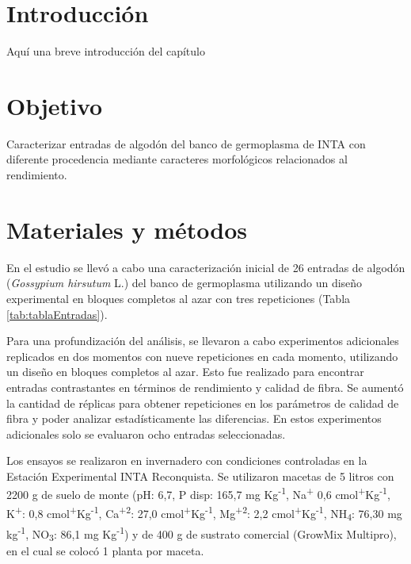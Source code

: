\documentclass[12pt,oneside]{reedthesis}
\begin{document}
\section{Introducción}\label{introducciuxf3n-1}

Aquí una breve introducción del capítulo\\

\section{Objetivo}\label{objetivo}

Caracterizar entradas de algodón del banco de germoplasma de INTA con diferente procedencia mediante caracteres morfológicos relacionados al rendimiento.

\section{Materiales y métodos}\label{materiales-y-muxe9todos}

En el estudio se llevó a cabo una caracterización inicial de 26 entradas de algodón (\emph{Gossypium hirsutum} L.) del banco de germoplasma utilizando un diseño experimental en bloques completos al azar con tres repeticiones (Tabla \ref{tab:tablaEntradas}).

Para una profundización del análisis, se llevaron a cabo experimentos adicionales replicados en dos momentos con nueve repeticiones en cada momento, utilizando un diseño en bloques completos al azar. Esto fue realizado para encontrar entradas contrastantes en términos de rendimiento y calidad de fibra. Se aumentó la cantidad de réplicas para obtener repeticiones en los parámetros de calidad de fibra y poder analizar estadísticamente las diferencias. En estos experimentos adicionales solo se evaluaron ocho entradas seleccionadas.

Los ensayos se realizaron en invernadero con condiciones controladas en la Estación Experimental INTA Reconquista. Se utilizaron macetas de 5 litros con 2200 g de suelo de monte (pH: 6,7, P disp: 165,7 mg Kg\textsuperscript{-1}, Na\textsuperscript{+} 0,6 cmol\textsuperscript{+}Kg\textsuperscript{-1}, K\textsuperscript{+}: 0,8 cmol\textsuperscript{+}Kg\textsuperscript{-1}, Ca\textsuperscript{+2}: 27,0 cmol\textsuperscript{+}Kg\textsuperscript{-1}, Mg\textsuperscript{+2}: 2,2 cmol\textsuperscript{+}Kg\textsuperscript{-1}, NH\textsubscript{4}: 76,30 mg kg\textsuperscript{-1}, NO\textsubscript{3}: 86,1 mg Kg\textsuperscript{-1}) y de 400 g de sustrato comercial (GrowMix Multipro), en el cual se colocó 1 planta por maceta.
\end{document}
